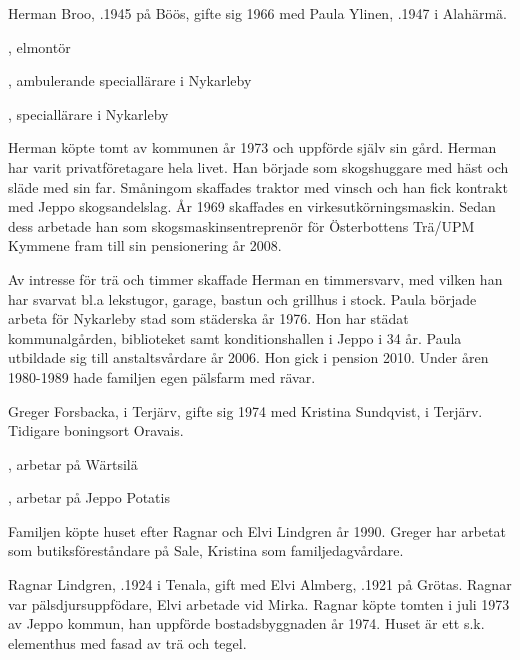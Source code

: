 
Herman Broo, .1945 på Böös, gifte sig 1966 med Paula Ylinen, .1947 i Alahärmä.
\begin{jhchildren}
  \item {}, elmontör
  \item {}, ambulerande speciallärare i Nykarleby
  \item {}, speciallärare i Nykarleby
\end{jhchildren}

Herman  köpte tomt av kommunen år 1973 och uppförde själv sin gård. Herman har varit privatföretagare hela livet. Han började som skogshuggare med häst och släde med sin far. Småningom skaffades traktor med vinsch och han fick kontrakt med Jeppo skogsandelslag. År 1969 skaffades en virkesutkörningsmaskin. Sedan dess arbetade han som skogsmaskinsentreprenör för Österbottens Trä/UPM Kymmene fram till sin pensionering år 2008.

Av intresse för trä och timmer skaffade Herman en timmersvarv, med vilken han har svarvat bl.a lekstugor, garage, bastun och grillhus i stock. Paula började arbeta för Nykarleby stad som städerska år 1976. Hon har städat kommunalgården, biblioteket samt konditionshallen i Jeppo i 34 år. Paula utbildade sig till anstaltsvårdare år 2006. Hon gick i pension 2010. Under åren 1980-1989 hade familjen egen pälsfarm med rävar.




Greger Forsbacka,  i Terjärv, gifte sig 1974 med Kristina Sundqvist,  i Terjärv. Tidigare boningsort Oravais.
\begin{jhchildren}
  \item {}, arbetar på Wärtsilä
  \item {}, arbetar på Jeppo Potatis
\end{jhchildren}
Familjen köpte huset efter Ragnar och Elvi Lindgren år 1990. Greger har arbetat som butiksföreståndare på Sale, Kristina som familjedagvårdare.

Ragnar Lindgren, .1924 i Tenala, gift med Elvi Almberg, .1921 på Grötas. Ragnar var pälsdjursuppfödare, Elvi arbetade vid Mirka. Ragnar köpte tomten i juli 1973 av Jeppo kommun, han uppförde 				bostadsbyggnaden år 1974. Huset är ett s.k. elementhus med fasad av trä och tegel.

